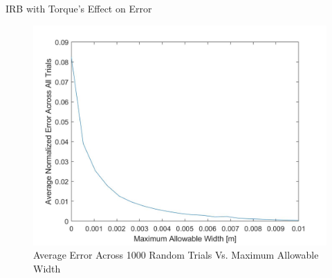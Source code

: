 \begin{frame}{IRB with Torque's Effect on Error}
    \begin{figure}
        \centering
        \includegraphics[scale=0.15]{figures/IRBErrorVsMaxWidth.jpg}
        \caption{Average Error Across 1000 Random Trials Vs. Maximum Allowable Width}
        \label{fig:IRBErrorVSMaxWidth}
    \end{figure}
\end{frame}


